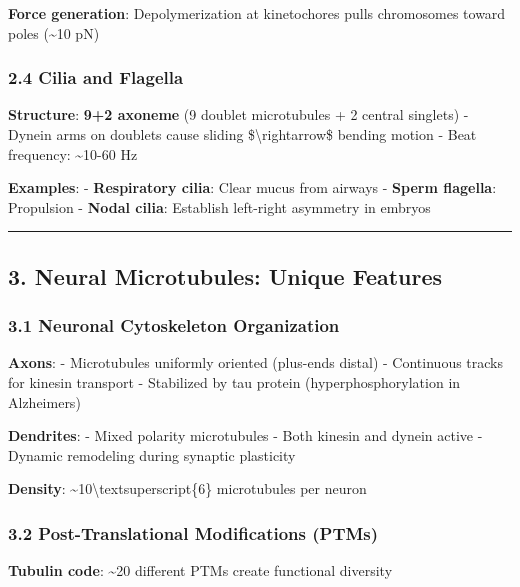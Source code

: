 \textbf{Force generation}: Depolymerization at kinetochores pulls
chromosomes toward poles (\textasciitilde10 pN)

\subsubsection{2.4 Cilia and Flagella}\label{cilia-and-flagella}

\textbf{Structure}: \textbf{9+2 axoneme} (9 doublet microtubules + 2
central singlets) - Dynein arms on doublets cause sliding
\$\textbackslash rightarrow\$ bending motion - Beat frequency:
\textasciitilde10-60 Hz

\textbf{Examples}: - \textbf{Respiratory cilia}: Clear mucus from
airways - \textbf{Sperm flagella}: Propulsion - \textbf{Nodal cilia}:
Establish left-right asymmetry in embryos

\begin{center}\rule{0.5\linewidth}{0.5pt}\end{center}

\subsection{3. Neural Microtubules: Unique
Features}\label{neural-microtubules-unique-features}

\subsubsection{3.1 Neuronal Cytoskeleton
Organization}\label{neuronal-cytoskeleton-organization}

\textbf{Axons}: - Microtubules uniformly oriented (plus-ends distal) -
Continuous tracks for kinesin transport - Stabilized by tau protein
(hyperphosphorylation in Alzheimer\textquotesingle s)

\textbf{Dendrites}: - Mixed polarity microtubules - Both kinesin and
dynein active - Dynamic remodeling during synaptic plasticity

\textbf{Density}: \textasciitilde10\textbackslash textsuperscript\{6\}
microtubules per neuron

\subsubsection{3.2 Post-Translational Modifications
(PTMs)}\label{post-translational-modifications-ptms}

\textbf{Tubulin code}: \textasciitilde20 different PTMs create
functional diversity

